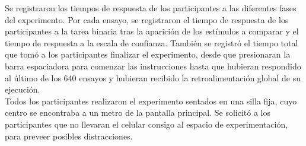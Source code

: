 Se registraron los tiempos de respuesta de los participantes a las diferentes fases del experimento. Por cada ensayo, se registraron el tiempo de respuesta de los participantes a la tarea binaria tras la aparición de los estímulos a comparar y el tiempo de respuesta a la escala de confianza. También se registró el tiempo total que tomó a los participantes finalizar el experimento, desde que presionaran la barra espaciadora para comenzar las instrucciones hasta que hubieran respondido al último de los 640 ensayos y hubieran recibido la retroalimentación global de su ejecución.\\

Todos los participantes realizaron el experimento sentados en una silla fija, cuyo centro se encontraba a un metro de la pantalla principal. Se solicitó a los participantes que no llevaran el celular consigo al espacio de experimentación, para preveer posibles distracciones. \\




